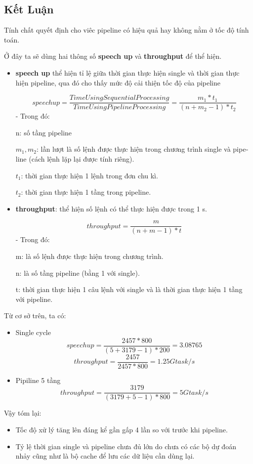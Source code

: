 \documentclass[E:/Latex/ExtraWork/ComputerArchitechture/Report.tex]{subfiles}
\begin{document}
	\begin{otherlanguage}{english}
		\chapter{Kết Luận}
			Tính chất quyết định cho viêc pipeline có hiệu quả hay không nằm ở tốc độ tính toán.
			
			Ở đây ta sẽ dùng hai thông số \textbf{speech up} và \textbf{throughput} để thể hiện.
			
			\begin{itemize}
					\item \textbf{speech up} thể hiện tỉ lệ giữa thời gian thực hiện single và thời gian thực hiện pipeline, qua đó cho thấy mức độ cải thiện tốc độ của pipeline

					$$speech up=\frac{Time Using Sequential Processing}{Time Using Pipeline Processing}=\frac{m_1 * t_1}{(n+m_2-1)*t_2}$$
					- Trong đó: 
						
						n: số tầng pipeline
						
						$m_1,m_2$: lần lượt là số lệnh được thực hiện trong chương trình single và pipeline (cách lệnh lặp lại được tính riêng).
						
						$t_1$: thời gian thực hiện 1 lệnh trong đơn chu kì.
						
						$t_2$: thời gian thực hiện 1 tầng trong pipeline.

					\item \textbf{throughput}: thể hiện số lệnh có thể thực hiện được trong 1 s.

					$$throughput=\frac{m}{(n+m-1)*t}$$
					- Trong đó:

						m: là số lệnh được thực hiện trong chương trình.
					
						n: là số tầng pipeline (bằng 1 với single).
					
						t: thời gian thực hiện 1 câu lệnh với single và là thời gian thực hiện 1 tầng với pipeline.
			\end{itemize}

			Từ cơ sở trên, ta có:
			 	\begin{itemize}
					\item Single cycle
					$$speech up=\frac{2457 * 800}{(5+3179-1)*200}=3.08765$$
					$$throughput=\frac{2457}{2457*800}=1.25G task/s$$
					\item Pipiline 5 tầng
					$$throughput=\frac{3179}{(3179+5-1)*800}=5G task/s$$
				\end{itemize}

			Vậy tóm lại:
				\begin{itemize}
					\item Tốc độ xử lý tăng lên đáng kể gần gấp 4 lần so với trước khi pipeline.
					\item Tỷ lệ thời gian single và pipeline chưa đủ lớn do chưa có các bộ dự đoán nhảy cũng như là bộ cache để lưu các dữ liệu cần dùng lại.
				\end{itemize}



			

	\end{otherlanguage}
\end{document}
